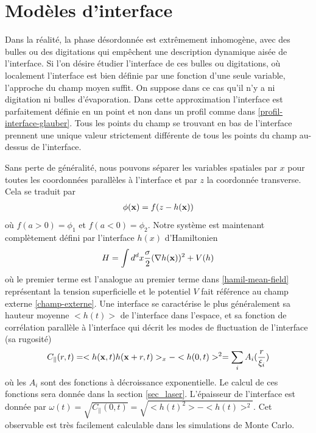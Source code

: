     \section{Modèles d'interface}

Dans la réalité, la phase désordonnée est extrêmement inhomogène, avec des bulles ou des digitations qui empêchent une description dynamique aisée de l'interface. Si l'on désire étudier l'interface de ces bulles ou digitations, où localement l'interface est bien définie par une fonction d'une seule variable, l'approche du champ moyen suffit. On suppose dans ce cas qu'il n'y a ni digitation ni bulles d'évaporation. Dans cette approximation l'interface est parfaitement définie en un point et non dans un profil comme dans \ref{profil-interface-glauber}. Tous les points du champ se trouvant en bas de l'interface prennent une unique valeur strictement différente de tous les points du champ au-dessus de l'interface. 

Sans perte de généralité, nous pouvons séparer les variables spatiales par $x$ pour toutes les coordonnées parallèles à l'interface et par $z$ la coordonnée transverse. Cela se traduit par
\begin{align}
    \phi({\bf x}) = f(z-h({\bf x}))
    \label{capillary-wave-theory}
\end{align}
où $f(a \greater 0) = \phi_1$ et $f(a \less 0) = \phi_2$. Notre système est maintenant complètement défini par l'interface $h(x)$ d'Hamiltonien
\begin{align}
    H = \int d^d x \frac{\sigma}{2} (\nabla h({\bf x}))^2 + V(h)
    \label{hamil-cwt}
\end{align}
où le premier terme est l'analogue au premier terme dans \ref{hamil-mean-field} représentant la tension superficielle et le potentiel $V$ fait référence au champ externe \ref{champ-externe}. 
Une interface se caractérise le plus généralement sa hauteur moyenne $<h(t)>$ de l'interface dans l'espace, et sa fonction de corrélation parallèle à l'interface qui décrit les modes de fluctuation de l'interface (sa rugosité)
\begin{align}
    C_\parallel(r,t) = <h({\bf x},t)h({\bf x}+r,t)>_x - <h(0,t)>^2 = \sum_i A_i(\frac{r}{\xi_i}) 
\end{align}
où les $A_i$ sont des fonctions à décroissance exponentielle. Le calcul de ces fonctions sera donnée dans la section \ref{sec_laser}. 
L'épaisseur de l'interface est donnée par $\omega(t) = \sqrt{C_\parallel(0,t)} = \sqrt{<h(t)^2> - <h(t)>^2}$. Cet observable est très facilement calculable dans les simulations de Monte Carlo.

